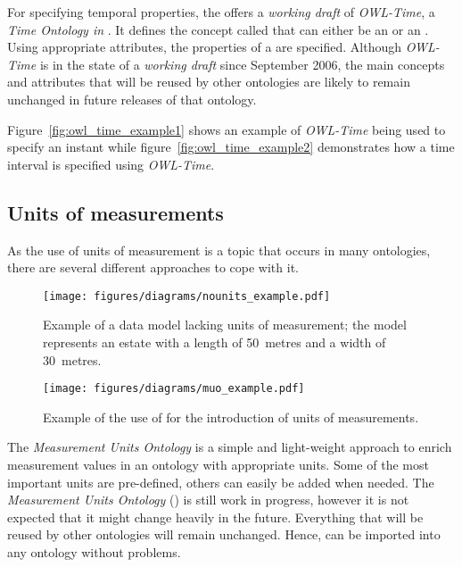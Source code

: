 For specifying temporal properties, the  offers a \emph{working draft} of \emph{OWL-Time}\cite{owl-time}, a \emph{Time Ontology in }. It defines the concept called  that can either be an  or an . Using appropriate attributes, the properties of a  are specified. Although \emph{OWL-Time} is in the state of a \emph{working draft} since September 2006, the main concepts and attributes that will be reused by other ontologies are likely to remain unchanged in future releases of that ontology.

Figure~\ref{fig:owl_time_example1} shows an example of \emph{OWL-Time} being used to specify an instant while figure~\ref{fig:owl_time_example2} demonstrates how a time interval is specified using \emph{OWL-Time}.

\subsection{Units of measurements}
\label{subsec:unit_ontologies}

As the use of units of measurement is a topic that occurs in many ontologies, there are several different approaches to cope with it.

\begin{figure}
\centering
\texttt{[image: figures/diagrams/nounits\_example.pdf]}
\caption{Example of a data model lacking units of measurement; the model represents an estate with a length of \SI{50}{metres} and a width of \SI{30}{metres}.}
\label{fig:nounits_example}
\end{figure}

\begin{figure}
\centering
\texttt{[image: figures/diagrams/muo\_example.pdf]}
\caption{Example of the use of \muo for the introduction of units of measurements.}
\label{fig:muo_example}
\end{figure}

The \emph{Measurement Units Ontology}\cite{MUOWeb,MUO} is a simple and light-weight approach to enrich measurement values in an ontology with appropriate units. Some of the most important units are pre-defined, others can easily be added when needed. The \emph{Measurement Units Ontology} (\muo) is still work in progress, however it is not expected that it might change heavily in the future. Everything that will be reused by other ontologies will remain unchanged. Hence, \muo can be imported into any ontology without problems.

